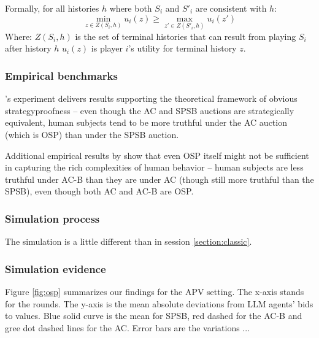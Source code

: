 \documentclass{article} %
\begin{document}
Formally, for all histories $h$ where both $S_i$ and $S'_i$ are consistent with $h$:
\begin{equation}
\min_{z \in Z(S_i, h)} u_i(z) \geq \max_{z' \in Z(S'_i, h)} u_i(z')
\end{equation}
Where: $Z(S_i, h)$ is the set of terminal histories that can result from playing $S_i$ after history $h$
$u_i(z)$ is player $i$'s utility for terminal history $z$. 

\subsubsection{Empirical benchmarks}
\citet{li2017obviously}'s experiment delivers results supporting the theoretical framework of obvious strategyproofness -- even though the AC and SPSB auctions are strategically equivalent, human subjects tend to be more truthful under the AC auction (which is OSP) than under the SPSB auction. 

Additional empirical results by \citet{breitmoser2022obviousness} show that even OSP itself might not be sufficient in capturing the rich complexities of human behavior -- human subjects are less truthful under AC-B than they are under AC (though still more truthful than the SPSB), even though both AC and AC-B are OSP. 

\subsubsection{Simulation process}
The simulation is a little different than in session \ref{section:classic}.




\subsubsection{Simulation evidence}
Figure \ref{fig:osp} summarizes our findings for the APV setting. The x-axis stands for the rounds.
The y-axis is the mean absolute
deviations from LLM agents' bids to values. Blue solid curve is the mean for SPSB, red dashed for the AC-B and gree dot dashed lines for the AC.
Error bars are the variations ...
\end{document}
